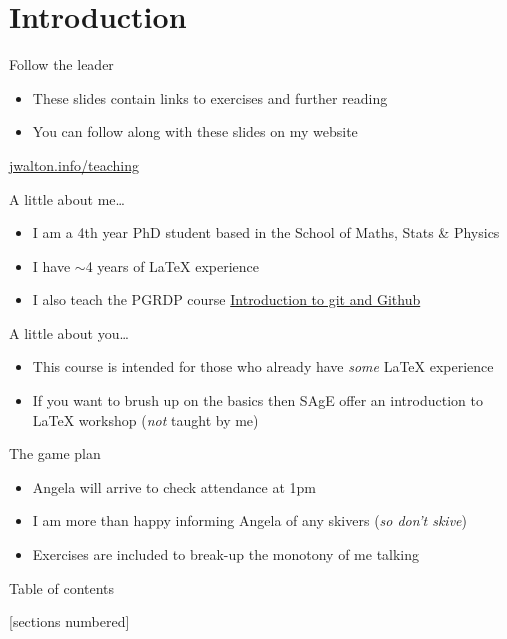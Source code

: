 \section*{Introduction}

\begin{frame}{Follow the leader}
  \begin{itemize}
    \item These slides contain links to exercises and further reading
    \item You can follow along with these slides on my website
  \end{itemize}  
  \centering\Large \href{https://jwalton.info/teaching/}{jwalton.info/teaching}
\end{frame}

\begin{frame}{A little about me\ldots}
  \begin{itemize}
    \item I am a 4th year PhD student based in the School of Maths, Stats
      \& Physics
    \item I have $\sim$4 years of \LaTeX{} experience
    \item I also teach the PGRDP course
      \href{https://workshops.ncl.ac.uk/view/book/modal/43153/}%
      {Introduction to git and Github}
  \end{itemize}
\end{frame}

\begin{frame}{A little about you\ldots}
  \begin{itemize}
    \item This course is intended for those who already have \emph{some} \LaTeX{} 
      experience
    \item If you want to brush up on the basics then SAgE offer an
      introduction to \LaTeX{} workshop (\emph{not} taught by me)
  \end{itemize}
\end{frame}

\begin{frame}{The game plan}
  \begin{itemize}
    \item Angela will arrive to check attendance at 1pm
    \item I am more than happy informing Angela of any skivers 
      (\emph{so don't skive})
    \item Exercises are included to break-up the monotony of me talking
  \end{itemize}
\end{frame}

\begin{frame}{Table of contents}
  [sections numbered]
  \tableofcontents[hideallsubsections]
\end{frame}

